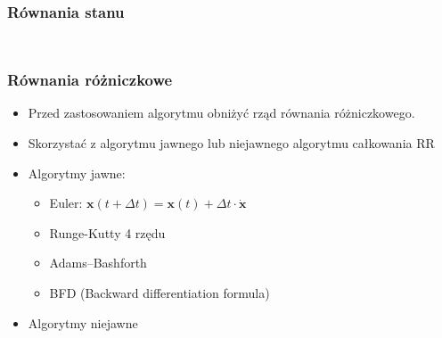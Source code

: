 \documentclass[aspectratio=169]{beamer}
\begin{document}
\begin{frame}%
	\frametitle{Równania stanu}
	\begin{columns}
		\begin{column}{0.3\textwidth}
	      		 	\uncover<2->{\[
				\begin{cases}
					\dot{\bm{x}} \left(t\right)  = \bm{Ax} \left(t\right)  + \bm{Bu} \left(t\right) \\
					\bm{y} \left(t\right) = \bm{Cx} \left(t\right) + \bm{Du} \left(t\right)
				\end{cases}
				\]}
				\uncover<3->{\[
				\begin{cases}
					\dot{\bm{x}} \left(t\right)  = \bm{f} \left(t,\bm{x}\left(t\right),\bm{u}\left(t\right) \right) \\
					\bm{y} \left(t\right) = \bm{g} \left(t,\bm{x}\left(t\right),\bm{u}\left(t\right) \right)
				\end{cases}
				\]}	
		\end{column}
		\begin{column}{0.7\textwidth}
	   	 	\begin{figure}
	   		 \centering
	    		\end{figure}
		\end{column}
	\end{columns}
\end{frame}

\begin{frame}%
	\frametitle{Równania różniczkowe}
	\begin{itemize}
	  \item{
	    Przed zastosowaniem algorytmu obniżyć rząd równania różniczkowego.
	    \pause
	  }
	  \item {   
	    Skorzystać z algorytmu jawnego lub niejawnego algorytmu całkowania RR
	    \pause
	  }
	  \item {
	    Algorytmy jawne:
	    \pause
	    \begin{itemize}
		  \item{
		    Euler: $\bm{x}\left(t + \Delta t\right) = \bm{x}\left(t\right) + \Delta t \cdot \bm{\dot{x}} $
		    \pause
		  }
		  \item {   
		    Runge-Kutty 4 rzędu
		    \pause
		  }
		  \item {   
		    Adams–Bashforth
		    \pause
		  }
		  \item {   
		    BFD (Backward differentiation formula)
		    \pause
		  }
	     \end{itemize}
	     \pause
	  }
	  \item {   
	    Algorytmy niejawne
	  }
 	 \end{itemize}
\end{frame}
\end{document}
